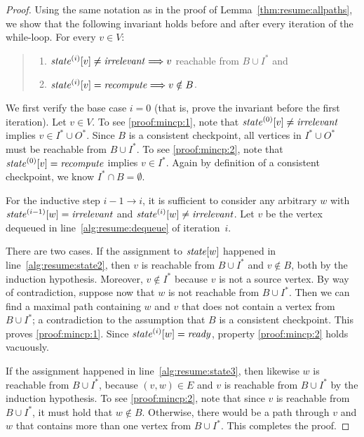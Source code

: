 \documentclass[paper=letter,fontsize=11pt,captions=tableheading]{scrartcl}
\numberwithin{equation}{section}
\theoremstyle{algorithm}
\theoremstyle{plain}
\theoremstyle{nonumberplain}
\newtheorem{proof}{Proof}
\begin{document}
\begin{proof}
	Using the same notation as in the proof of Lemma~\ref{thm:resume:allpaths}, we show that the following invariant holds before and after every iteration of the while-loop. For every $v \in V$:
	\begin{quote}
		\begin{enumerate}
			\item \label{proof:mincp:1} $\mathit{state}^{(i)}[v] \neq \mathit{irrelevant} \Longrightarrow v$ reachable from $B \cup I^*$ and
			\item \label{proof:mincp:2} $\mathit{state}^{(i)}[v] = \mathit{recompute} \Longrightarrow v \notin B$.
		\end{enumerate}
	\end{quote}
	We first verify the base case $i = 0$ (that is, prove the invariant before the first iteration). Let $v \in V$. To see \eqref{proof:mincp:1}, note that $\mathit{state}^{(0)}[v] \neq \mathit{irrelevant}$ implies $v \in I^* \cup O^*$. Since $B$ is a consistent checkpoint, all vertices in $I^* \cup O^*$ must be reachable from $B \cup I^*$. To see \eqref{proof:mincp:2}, note that $\mathit{state}^{(0)}[v] = \mathit{recompute}$ implies $v \in I^*$. Again by definition of a consistent checkpoint, we know $I^* \cap B = \emptyset$.

	For the inductive step $i - 1 \to i$, it is sufficient to consider any arbitrary $w$ with $\mathit{state}^{(i - 1)}[w] = \mathit{irrelevant}$ and $\mathit{state}^{(i)}[w] \neq \mathit{irrelevant}$. Let $v$ be the vertex dequeued in line~\ref{alg:resume:dequeue} of iteration~$i$.

	There are two cases. If the assignment to $\mathit{state}[w]$ happened in line~\ref{alg:resume:state2}, then $v$ is reachable from $B \cup I^*$ and $v \notin B$, both by the induction hypothesis. Moreover, $v \notin I^*$ because $v$ is not a source vertex. By way of contradiction, suppose now that $w$ is not reachable from $B \cup I^*$. Then we can find a maximal path containing $w$ and $v$ that does not contain a vertex from $B \cup I^*$; a contradiction to the assumption that $B$ is a consistent checkpoint. This proves \eqref{proof:mincp:1}. Since $\mathit{state}^{(i)}[w] = \mathit{ready}$, property \eqref{proof:mincp:2} holds vacuously.

	If the assignment happened in line~\ref{alg:resume:state3}, then likewise $w$ is reachable from $B \cup I^*$, because $(v,w) \in E$ and $v$ is reachable from $B \cup I^*$ by the induction hypothesis. To see \eqref{proof:mincp:2}, note that since $v$ is reachable from $B \cup I^*$, it must hold that $w \notin B$. Otherwise, there would be a path through $v$ and $w$ that contains more than one vertex from $B \cup I^*$. This completes the proof.
\end{proof}
\end{document}

